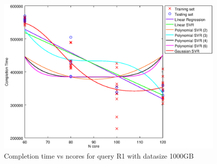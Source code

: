 
\begin {figure}[hbtp]
\centering
\includegraphics[width=\textwidth]{output/R1_1000_ONLY_1_LINEAR_NCORE/plot_R1_1000.eps}
\caption{Completion time vs ncores for query R1 with datasize 1000GB}
\label{fig:only_1_linear_R1_1000}
\end {figure}
